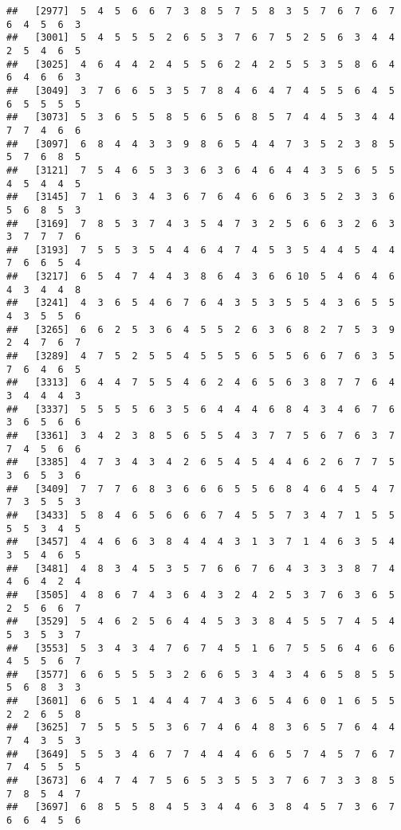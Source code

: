 \documentclass[
]{book}
\begin{document}
\begin{verbatim}
##   [2977]  5  4  5  6  6  7  3  8  5  7  5  8  3  5  7  6  7  6  7  6  4  5  6  3
##   [3001]  5  4  5  5  5  2  6  5  3  7  6  7  5  2  5  6  3  4  4  2  5  4  6  5
##   [3025]  4  6  4  4  2  4  5  5  6  2  4  2  5  5  3  5  8  6  4  6  4  6  6  3
##   [3049]  3  7  6  6  5  3  5  7  8  4  6  4  7  4  5  5  6  4  5  6  5  5  5  5
##   [3073]  5  3  6  5  5  8  5  6  5  6  8  5  7  4  4  5  3  4  4  7  7  4  6  6
##   [3097]  6  8  4  4  3  3  9  8  6  5  4  4  7  3  5  2  3  8  5  5  7  6  8  5
##   [3121]  7  5  4  6  5  3  3  6  3  6  4  6  4  4  3  5  6  5  5  4  5  4  4  5
##   [3145]  7  1  6  3  4  3  6  7  6  4  6  6  6  3  5  2  3  3  6  5  6  8  5  3
##   [3169]  7  8  5  3  7  4  3  5  4  7  3  2  5  6  6  3  2  6  3  3  7  7  7  6
##   [3193]  7  5  5  3  5  4  4  6  4  7  4  5  3  5  4  4  5  4  4  7  6  6  5  4
##   [3217]  6  5  4  7  4  4  3  8  6  4  3  6  6 10  5  4  6  4  6  4  3  4  4  8
##   [3241]  4  3  6  5  4  6  7  6  4  3  5  3  5  5  4  3  6  5  5  4  3  5  5  6
##   [3265]  6  6  2  5  3  6  4  5  5  2  6  3  6  8  2  7  5  3  9  2  4  7  6  7
##   [3289]  4  7  5  2  5  5  4  5  5  5  6  5  5  6  6  7  6  3  5  7  6  4  6  5
##   [3313]  6  4  4  7  5  5  4  6  2  4  6  5  6  3  8  7  7  6  4  3  4  4  4  3
##   [3337]  5  5  5  5  6  3  5  6  4  4  4  6  8  4  3  4  6  7  6  3  6  5  6  6
##   [3361]  3  4  2  3  8  5  6  5  5  4  3  7  7  5  6  7  6  3  7  7  4  5  6  6
##   [3385]  4  7  3  4  3  4  2  6  5  4  5  4  4  6  2  6  7  7  5  3  6  5  3  6
##   [3409]  7  7  7  6  8  3  6  6  6  5  5  6  8  4  6  4  5  4  7  7  3  5  5  3
##   [3433]  5  8  4  6  5  6  6  6  7  4  5  5  7  3  4  7  1  5  5  5  5  3  4  5
##   [3457]  4  4  6  6  3  8  4  4  4  3  1  3  7  1  4  6  3  5  4  3  5  4  6  5
##   [3481]  4  8  3  4  5  3  5  7  6  6  7  6  4  3  3  3  8  7  4  4  6  4  2  4
##   [3505]  4  8  6  7  4  3  6  4  3  2  4  2  5  3  7  6  3  6  5  2  5  6  6  7
##   [3529]  5  4  6  2  5  6  4  4  5  3  3  8  4  5  5  7  4  5  4  5  3  5  3  7
##   [3553]  5  3  4  3  4  7  6  7  4  5  1  6  7  5  5  6  4  6  6  4  5  5  6  7
##   [3577]  6  6  5  5  5  3  2  6  6  5  3  4  3  4  6  5  8  5  5  5  6  8  3  3
##   [3601]  6  6  5  1  4  4  4  7  4  3  6  5  4  6  0  1  6  5  5  2  2  6  5  8
##   [3625]  7  5  5  5  5  3  6  7  4  6  4  8  3  6  5  7  6  4  4  7  4  3  5  3
##   [3649]  5  5  3  4  6  7  7  4  4  4  6  6  5  7  4  5  7  6  7  7  4  5  5  5
##   [3673]  6  4  7  4  7  5  6  5  3  5  5  3  7  6  7  3  3  8  5  7  8  5  4  7
##   [3697]  6  8  5  5  8  4  5  3  4  4  6  3  8  4  5  7  3  6  7  6  6  4  5  6

\end{verbatim}
\end{document}
